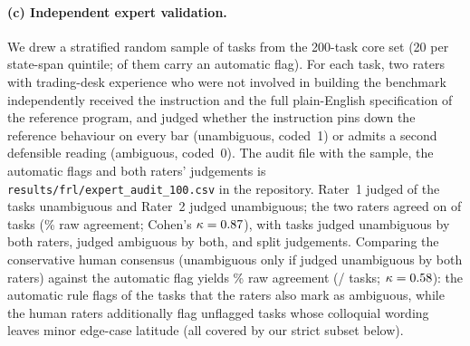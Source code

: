\documentclass[11pt,a4paper]{article}
\begin{document}
\begin{table}[h]\centering\footnotesize
\caption*{\textbf{Table R1.} Silent-failure share and median $|IS|$ on unambiguous vs ambiguous tasks, and share of each model's silent failures attributable to ambiguity (four instruments pooled; low-cost models on all tasks, frontier models on the 200-task subset).}

\end{table}

\paragraph{(c) Independent expert validation.} We drew a stratified random sample of \RevAuditN{} tasks from the 200-task core set (20 per state-span quintile; \RevAuditAutoFlagged{} of them carry an automatic flag). For each task, two raters with trading-desk experience who were not involved in building the benchmark independently received the instruction and the full plain-English specification of the reference program, and judged whether the instruction pins down the reference behaviour on every bar (unambiguous, coded~1) or admits a second defensible reading (ambiguous, coded~0). The audit file with the sample, the automatic flags and both raters' judgements is \texttt{results/frl/expert\_audit\_100.csv} in the repository. Rater~1 judged \RevAuditRaterOneUnamb{} of the \RevAuditN{} tasks unambiguous and Rater~2 judged \RevAuditRaterTwoUnamb{} unambiguous; the two raters agreed on \RevAuditAgreeCount{} of \RevAuditN{} tasks (\RevAuditAgreePct\% raw agreement; Cohen's $\kappa=0.87$), with \RevAuditBothUnamb{} tasks judged unambiguous by both raters, \RevAuditBothAmb{} judged ambiguous by both, and \RevAuditDisagree{} split judgements. Comparing the conservative human consensus (unambiguous only if judged unambiguous by both raters) against the automatic flag yields \RevAuditAutoAgreePct\% raw agreement (\RevAuditAutoAgreeCount/\RevAuditN{} tasks; $\kappa=0.58$): the automatic rule flags \RevAuditAutoFlaggedConfirmed{} of the \RevAuditAutoFlagged{} tasks that the raters also mark as ambiguous, while the human raters additionally flag \RevAuditHumanExtraAmb{} unflagged tasks whose colloquial wording leaves minor edge-case latitude (all covered by our strict subset below).
\end{document}
